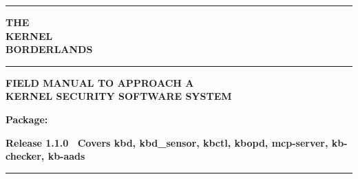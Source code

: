 \frontmatter
\begin{titlepage}
\thispagestyle{empty}
\centering
\vspace*{8mm}
{\rule{\textwidth}{5pt}\par}
\vspace{10mm}
{\bfseries\sffamily\fontsize{44}{48}\selectfont THE\\[6mm]KERNEL\\[6mm]BORDERLANDS\par}
\vspace{10mm}
{\rule{\textwidth}{1.5pt}\par}
\vspace{8mm}
{\bfseries\sffamily\Large FIELD MANUAL TO APPROACH A\\KERNEL SECURITY SOFTWARE SYSTEM\par}
\vspace{14mm}
\vfill
{\bfseries\sffamily Package: \pkgfile\par}
{\bfseries\sffamily Release 1.1.0 \textbullet\ Covers kbd, kbd\_sensor, kbctl, kbopd, mcp-server, kb-checker, kb-aads\par}
\vspace{6mm}
{\rule{\textwidth}{5pt}\par}
\end{titlepage}
\mainmatter
